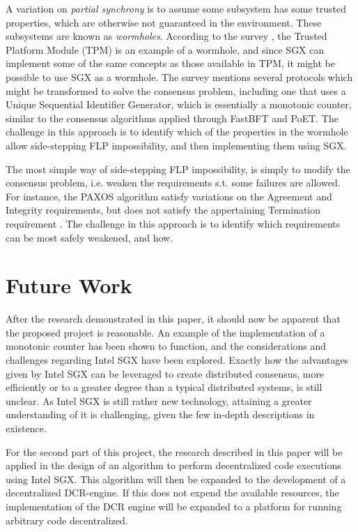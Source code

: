 \documentclass[12pt]{article}
\begin{document}
		A variation on \textit{partial synchrony} is to assume some subsystem has some trusted properties, which are otherwise not guaranteed in the environment. These subsystems are known as \textit{wormholes}. 
		According to the survey \cite{consensus-survey}, the Trusted Platform Module (TPM) is an example of a wormhole, and since SGX can implement some of the same concepts as those available in TPM, it might be possible to use SGX as a wormhole. 
		The survey mentions several protocols which might be transformed to solve the consensus problem, including one that uses a Unique Sequential Identifier Generator, which is essentially a monotonic counter, similar to the consensus algorithms applied through FastBFT and PoET. 
		The challenge in this approach is to identify which of the properties in the wormhole allow side-stepping FLP impossibility, and then implementing them using SGX.

		The most simple way of side-stepping FLP impossibility, is simply to modify the consensus problem, i.e. weaken the requirements s.t. some failures are allowed. 
		For instance, the PAXOS algorithm \cite{paxos} satisfy variations on the Agreement and Integrity requirements, but does not satisfy the appertaining Termination requirement \cite{fast-byz-cons}. 
		The challenge in this approach is to identify which requirements can be most safely weakened, and how.
		
	\section{Future Work}
	After the research demonstrated in this paper, it should now be apparent that the proposed project is reasonable.
	An example of the implementation of a monotonic counter has been shown to function, and the considerations and challenges regarding Intel SGX have been explored.
	Exactly how the advantages given by Intel SGX can be leveraged to create distributed consensus, more efficiently or to a greater degree than a typical distributed systems, is still unclear.
	As Intel SGX is still rather new technology, attaining a greater understanding of it is challenging, given the few in-depth descriptions in existence.

	For the second part of this project, the research described in this paper will be applied in the design of an algorithm to perform decentralized code executions using Intel SGX.
	This algorithm will then be expanded to the development of a decentralized DCR-engine.
	If this does not expend the available resources, the implementation of the DCR engine will be expanded to a platform for running arbitrary code decentralized.
\end{document}
